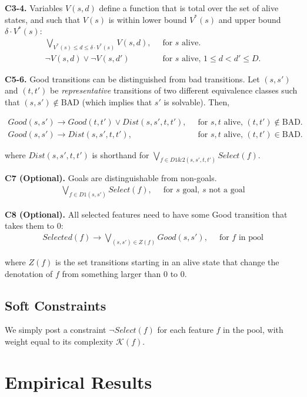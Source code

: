 \documentclass[a4paper]{article}
\newcommand{\smallpar}[1]{{\vspace{10pt}\noindent \bf #1.}}
\newcommand{\badtx}{\ensuremath{\mathrm{BAD}}}
\begin{document}
\smallpar{C3-4}
Variables $V(s, d)$ define a function that is total over the set of alive states,
and such that $V(s)$ is within lower bound $V^*(s)$ and upper bound $\delta \cdot V^*(s)$:
\begin{align}
 \bigvee_{V^*(s) \leq d \leq \delta \cdot V^*(s)} V(s,d),&\;\; \text{for $s$ alive.} \\
 \neg V(s, d) \lor \neg V(s, d')&\;\; \text{for $s$ alive, $1 \leq d < d' \leq D$.}
\end{align}


\smallpar{C5-6}
Good transitions can be distinguished from bad transitions.
Let $(s, s')$ and $(t, t')$ be \emph{representative} transitions
of two different equivalence classes such that $(s, s') \not\in \badtx$
(which implies that $s'$ is solvable). Then,

\begin{align}
 Good(s, s') \rightarrow Good(t, t') \lor
 Dist(s, s', t, t'),&\;\; \text{for $s, t$ alive, $(t, t') \not\in \badtx$.} \\
 Good(s, s') \rightarrow
 Dist(s, s', t, t'),&\;\; \text{for $s, t$ alive, $(t, t') \in \badtx$.}
\end{align}

\noindent where $Dist(s, s', t, t')$ is shorthand for $\bigvee_{f \in D1\&2(s, s', t, t')} Select(f)$.


\smallpar{C7 (Optional)}
Goals are distinguishable from non-goals.
\begin{align}
\bigvee_{f \in D1(s, s')} Select(f),&\;\; \text{for $s$ goal, $s$ not a goal}
\end{align}

\smallpar{C8 (Optional)}
All selected features need to have some Good transition that takes them to $0$:
\begin{align}
 Selected(f) \rightarrow \bigvee_{(s, s') \in Z(f)} Good(s, s'),&\;\; \text{for $f$ in pool}
\end{align}

\noindent where $Z(f)$ is the set transitions starting in an alive state that change the denotation of $f$ from something
larger than 0 to 0.


\subsection{Soft Constraints}
We simply post a constraint $\neg Select(f)$ for each feature $f$ in the pool, with weight equal to its complexity $\mathcal{K}(f)$.

\section{Empirical Results}
\end{document}
